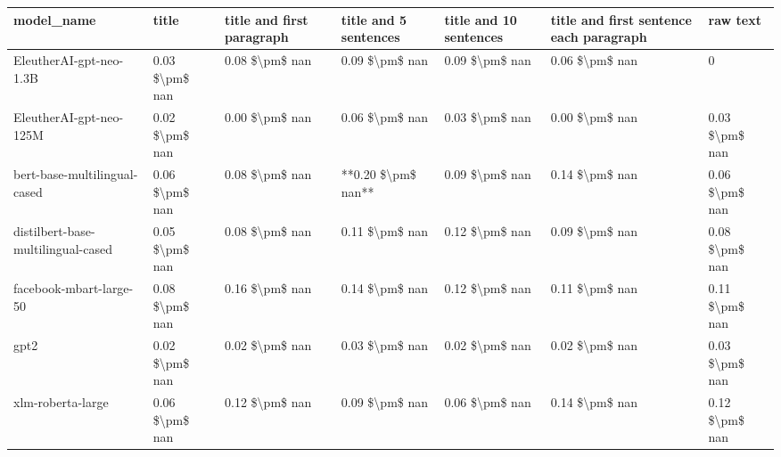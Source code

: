 \begin{tabular}{lllllll}
\toprule
                        model\_name &          title & title and first paragraph & title and 5 sentences & title and 10 sentences & title and first sentence each paragraph &       raw text \\
\midrule
           EleutherAI-gpt-neo-1.3B & 0.03 \$\textbackslash pm\$ nan &            0.08 \$\textbackslash pm\$ nan &        0.09 \$\textbackslash pm\$ nan &         0.09 \$\textbackslash pm\$ nan &                          0.06 \$\textbackslash pm\$ nan &              0 \\
           EleutherAI-gpt-neo-125M & 0.02 \$\textbackslash pm\$ nan &            0.00 \$\textbackslash pm\$ nan &        0.06 \$\textbackslash pm\$ nan &         0.03 \$\textbackslash pm\$ nan &                          0.00 \$\textbackslash pm\$ nan & 0.03 \$\textbackslash pm\$ nan \\
      bert-base-multilingual-cased & 0.06 \$\textbackslash pm\$ nan &            0.08 \$\textbackslash pm\$ nan &    **0.20 \$\textbackslash pm\$ nan** &         0.09 \$\textbackslash pm\$ nan &                          0.14 \$\textbackslash pm\$ nan & 0.06 \$\textbackslash pm\$ nan \\
distilbert-base-multilingual-cased & 0.05 \$\textbackslash pm\$ nan &            0.08 \$\textbackslash pm\$ nan &        0.11 \$\textbackslash pm\$ nan &         0.12 \$\textbackslash pm\$ nan &                          0.09 \$\textbackslash pm\$ nan & 0.08 \$\textbackslash pm\$ nan \\
           facebook-mbart-large-50 & 0.08 \$\textbackslash pm\$ nan &            0.16 \$\textbackslash pm\$ nan &        0.14 \$\textbackslash pm\$ nan &         0.12 \$\textbackslash pm\$ nan &                          0.11 \$\textbackslash pm\$ nan & 0.11 \$\textbackslash pm\$ nan \\
                              gpt2 & 0.02 \$\textbackslash pm\$ nan &            0.02 \$\textbackslash pm\$ nan &        0.03 \$\textbackslash pm\$ nan &         0.02 \$\textbackslash pm\$ nan &                          0.02 \$\textbackslash pm\$ nan & 0.03 \$\textbackslash pm\$ nan \\
                 xlm-roberta-large & 0.06 \$\textbackslash pm\$ nan &            0.12 \$\textbackslash pm\$ nan &        0.09 \$\textbackslash pm\$ nan &         0.06 \$\textbackslash pm\$ nan &                          0.14 \$\textbackslash pm\$ nan & 0.12 \$\textbackslash pm\$ nan \\
\bottomrule
\end{tabular}
